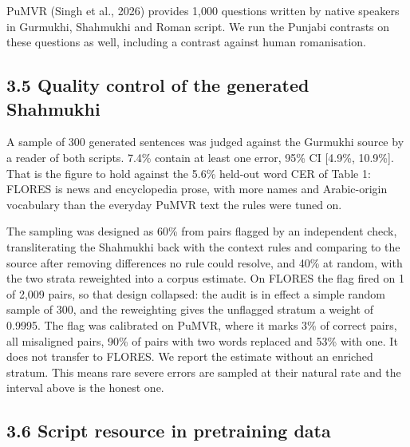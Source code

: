 PuMVR (Singh et al., 2026) provides 1,000 questions written by native
speakers in Gurmukhi, Shahmukhi and Roman script. We run the Punjabi
contrasts on these questions as well, including a contrast against human
romanisation.

\hypertarget{quality-control-of-the-generated-shahmukhi}{%
\subsection{3.5 Quality control of the generated
Shahmukhi}\label{quality-control-of-the-generated-shahmukhi}}

A sample of 300 generated sentences was judged against the Gurmukhi
source by a reader of both scripts. 7.4\% contain at least one error,
95\% CI {[}4.9\%, 10.9\%{]}. That is the figure to hold against the
5.6\% held-out word CER of Table 1: FLORES is news and encyclopedia
prose, with more names and Arabic-origin vocabulary than the everyday
PuMVR text the rules were tuned on.

The sampling was designed as 60\% from pairs flagged by an independent
check, transliterating the Shahmukhi back with the context rules and
comparing to the source after removing differences no rule could
resolve, and 40\% at random, with the two strata reweighted into a
corpus estimate. On FLORES the flag fired on 1 of 2,009 pairs, so that
design collapsed: the audit is in effect a simple random sample of 300,
and the reweighting gives the unflagged stratum a weight of 0.9995. The
flag was calibrated on PuMVR, where it marks 3\% of correct pairs, all
misaligned pairs, 90\% of pairs with two words replaced and 53\% with
one. It does not transfer to FLORES. We report the estimate without an
enriched stratum. This means rare severe errors are sampled at their
natural rate and the interval above is the honest one.

\hypertarget{script-resource-in-pretraining-data}{%
\subsection{3.6 Script resource in pretraining
data}\label{script-resource-in-pretraining-data}}

